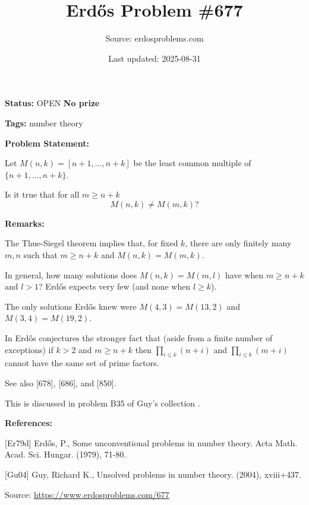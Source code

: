 \documentclass{article}
\title{Erd\H{o}s Problem \#677}
\date{Last updated: 2025-08-31}
\author{Source: erdosproblems.com}
\begin{document}
\maketitle

\noindent\textbf{Status:} OPEN \quad \textbf{No prize}

\noindent\textbf{Tags:} number theory

\medskip
\noindent\textbf{Problem Statement:}

Let $M(n,k)=[n+1,\ldots,n+k]$ be the least common multiple of $\{n+1,\ldots,n+k\}$.

Is it true that for all $m\geq n+k$\[M(n,k) \neq M(m,k)?\]

\bigskip
\noindent\textbf{Remarks:}

The Thue-Siegel theorem implies that, for fixed $k$, there are only finitely many $m,n$ such that $m\geq n+k$ and $M(n,k)=M(m,k)$.

In general, how many solutions does $M(n,k)=M(m,l)$ have when $m\geq n+k$ and $l>1$? Erd\H{o}s expects very few (and none when $l\geq k$). 

The only solutions Erd\H{o}s knew were $M(4,3)=M(13,2)$ and $M(3,4)=M(19,2)$. 

In \cite{Er79d} Erd\H{o}s conjectures the stronger fact that (aside from a finite number of exceptions) if $k>2$ and $m\geq n+k$ then $\prod_{i\leq k}(n+i)$ and $\prod_{i\leq k}(m+i)$ cannot have the same set of prime factors.

See also [678], [686], and [850].

This is discussed in problem B35 of Guy's collection \cite{Gu04}.

\bigskip
\noindent\textbf{References:}

[Er79d] Erd\H{o}s, P., Some unconventional problems in number theory. Acta Math. Acad. Sci. Hungar. (1979), 71-80.
 
 [Gu04] Guy, Richard K., Unsolved problems in number theory. (2004), xviii+437.

\bigskip
\noindent\small{Source: \url{https://www.erdosproblems.com/677}}
\end{document}
